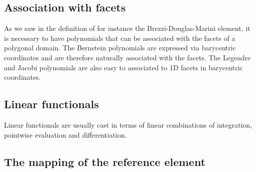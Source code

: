 \subsection{Association with facets}
As we saw in the definition of for instance the  Brezzi-Douglas-Marini element,  
it is necessary to have polynomials that can be associated with the facets of a polygonal 
domain. The Bernstein polynomials are expressed via barycentric coordinates
and are therefore naturally associated with the facets. The Legendre and Jacobi polynomials are
also easy to associated to 1D facets in barycentric coordinates.  


\subsection{Linear functionals}
Linear functionals are usually cast in terms of linear combinations of integration, pointwise evaluation and differentiation. 

\subsection{The mapping of the reference element}

